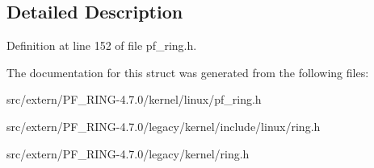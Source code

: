 \subsection{Detailed Description}


Definition at line 152 of file pf\_\-ring.h.



The documentation for this struct was generated from the following files:\begin{DoxyCompactItemize}
\item 
src/extern/PF\_\-RING-\/4.7.0/kernel/linux/pf\_\-ring.h\item 
src/extern/PF\_\-RING-\/4.7.0/legacy/kernel/include/linux/ring.h\item 
src/extern/PF\_\-RING-\/4.7.0/legacy/kernel/ring.h\end{DoxyCompactItemize}
